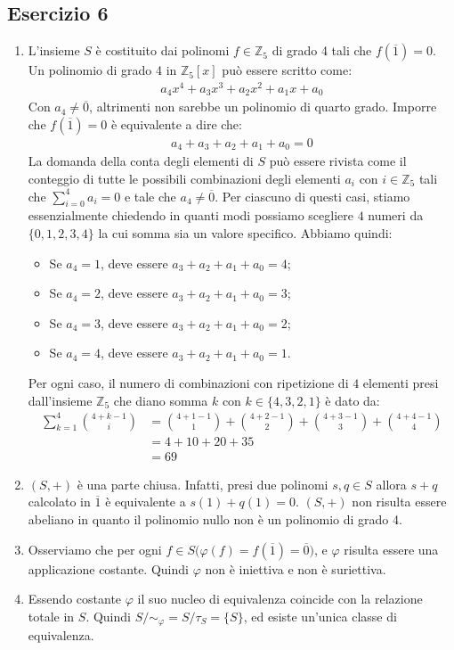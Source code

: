 \subsection*{Esercizio 6}
\begin{enumerate}[label=(\textit{\roman*})]
	\item L'insieme $S$ è costituito dai polinomi $f \in \mathbb{Z}_{5}$ di grado 4 tali che $f(\overline{1})=0$. Un polinomio di grado 4 in $\mathbb{Z}_{5}[x]$ può essere scritto come:
	\begin{align*}
		a_{4}x^{4}+a_{3}x^{3}+a_{2}x^{2}+a_{1}x+a_{0}
	\end{align*}
	Con $a_{4} \neq \overline{0}$, altrimenti non sarebbe un polinomio di quarto grado. Imporre che $f(\overline{1})=0$ è equivalente a dire che:
	\begin{align*}
		a_{4}+a_{3}+a_{2}+a_{1}+a_{0} = 0
	\end{align*}
	La domanda della conta degli elementi di $S$ può essere rivista come il conteggio di tutte le possibili combinazioni degli elementi $a_{i}$ con $i \in \mathbb{Z}_{5}$ tali che $\sum_{i=0}^{4} a_{i}=0$ e tale che $a_{4} \neq \overline{0}$.
	Per ciascuno di questi casi, stiamo essenzialmente chiedendo in quanti modi possiamo scegliere $4$ numeri da $\{0, 1, 2, 3, 4\}$ la cui somma sia un valore specifico. Abbiamo quindi:
	\begin{itemize}
		\item Se $a_{4}=1$, deve essere $a_{3}+a_{2}+a_{1}+a_{0}=4$;
		\item Se $a_{4}=2$, deve essere $a_{3}+a_{2}+a_{1}+a_{0}=3$;
		\item Se $a_{4}=3$, deve essere $a_{3}+a_{2}+a_{1}+a_{0}=2$;
		\item Se $a_{4}=4$, deve essere $a_{3}+a_{2}+a_{1}+a_{0}=1$.
	\end{itemize}
	Per ogni caso, il numero di combinazioni con ripetizione di $4$ elementi presi dall'insieme $\mathbb{Z}_{5}$ che diano somma $k$ con $k \in \{4,3,2,1\}$ è dato da:
	\begin{align*}
		\sum_{k=1}^{4} \binom{4+k-1}{i} &= \binom{4+1-1}{1}+\binom{4+2-1}{2}+\binom{4+3-1}{3}+\binom{4+4-1}{4} \\
		&= 4 + 10 + 20 + 35 \\
		&= 69
	\end{align*}
	\item $(S,+)$ è una parte chiusa. Infatti, presi due polinomi $s,q \in S$ allora $s+q$ calcolato in $\overline{1}$ è equivalente a $s(1)+q(1)=0$. $(S,+)$ non risulta essere abeliano in quanto il polinomio nullo non è un polinomio di grado 4.
	\item Osserviamo che per ogni $f \in S\bigl(\varphi(f)= f(\overline{1})=\overline{0}\bigr)$, e $\varphi$ risulta essere una applicazione costante. Quindi $\varphi$ non è iniettiva e non è suriettiva. 
	\item Essendo costante $\varphi$ il suo nucleo di equivalenza coincide con la relazione totale in $S$. Quindi $S/{\sim_{\varphi}} = S/{\tau_{S}} = \{S\}$, ed esiste un'unica classe di equivalenza.
\end{enumerate}
\vfill

